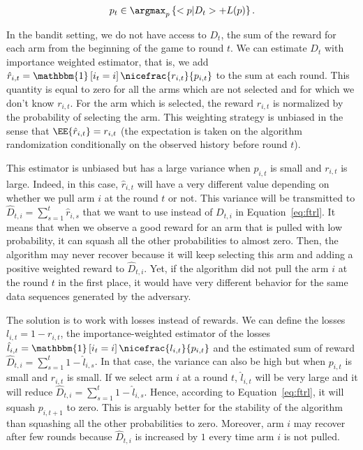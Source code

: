 {\begin{equation}
\label{eq:ftrl}
p_t \in \argmax_p \left\{ < p | D_t > + L(p)\right\}.
\end{equation}

In the bandit setting, we do not have access to $D_t$, the sum of the reward for each arm from the beginning of the game to round $t$. We can estimate $D_t$ with importance weighted estimator, that is, we add $\hat{r}_{i,t} = \mathbbm{1}\left[i_t =i \right] \nicefrac{r_{i,t}}{p_{i,t}}$ to the sum at each round. This quantity is equal to zero for all the arms which are not selected and for which we don't know $r_{i,t}$. For the arm which is selected, the reward $r_{i,t}$ is normalized by the probability of selecting the arm. This weighting strategy is unbiased in the sense that $\EE{\hat{r}_{i,t}} = r_{i,t}$ (the expectation is taken on the algorithm randomization conditionally on the observed history before round $t$).

This estimator is unbiased but has a large variance when $p_{i,t}$ is small and $r_{i,t}$ is large. Indeed, in this case, $\hat{r}_{i,t}$ will have a very different value depending on whether we pull arm $i$ at the round $t$ or not. This variance will be transmitted to $\hat{D}_{t,i} = \sum_{s=1}^t \hat{r}_{i,s}$ that we want to use instead of $D_{t,i}$ in Equation~\ref{eq:ftrl}. It means that when we observe a good reward for an arm that is pulled with low probability, it can squash all the other probabilities to almost zero. Then, the algorithm may never recover because it will keep selecting this arm and adding a positive weighted reward to $\hat{D}_{t,i}$. Yet, if the algorithm did not pull the arm $i$ at the round $t$ in the first place, it would have very different behavior for the same data sequences generated by the adversary. 

The solution is to work with losses instead of rewards. We can define the losses $l_{i,t} = 1 - r_{i,t}$, the importance-weighted estimator of the losses $\hat{l}_{i,t}  = \mathbbm{1}\left[i_t =i \right] \nicefrac{l_{i,t}}{p_{i,t}}$ and the estimated sum of reward $\hat{D}_{t,i} = \sum_{s=1}^t 1 - \hat{l}_{i,s}$. In that case, the variance can also be high but when $p_{i,t}$ is small and $r_{i,t}$ is small. If we select arm $i$ at a round $t$, $\hat{l}_{i,t}$ will be very large and it will reduce $\hat{D}_{t,i} = \sum_{s=1}^t 1 - \hat{l}_{i,s}$. Hence, according to Equation~\ref{eq:ftrl}, it will squash $p_{i,t+1}$ to zero. This is arguably better for the stability of the algorithm than squashing all the other probabilities to zero. Moreover, arm $i$ may recover after few rounds because $\hat{D}_{t,i}$ is increased by $1$ every time arm $i$ is not pulled. 

}

